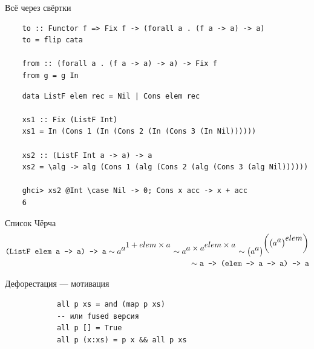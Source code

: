 
    \begin{frame}[fragile]{Всё через свёртки}
        \pause
        \begin{verbatim}
    to :: Functor f => Fix f -> (forall a . (f a -> a) -> a)
    to = flip cata

    from :: (forall a . (f a -> a) -> a) -> Fix f
    from g = g In
        \end{verbatim}
        \pause\vspace{1em}
        \begin{verbatim}
    data ListF elem rec = Nil | Cons elem rec

    xs1 :: Fix (ListF Int)
    xs1 = In (Cons 1 (In (Cons 2 (In (Cons 3 (In Nil))))))

    xs2 :: (ListF Int a -> a) -> a
    xs2 = \alg -> alg (Cons 1 (alg (Cons 2 (alg (Cons 3 (alg Nil))))))

    ghci> xs2 @Int \case Nil -> 0; Cons x acc -> x + acc
    6
        \end{verbatim}
    \end{frame}

    \begin{frame}[fragile]{Список Чёрча}
        \pause
        \begin{align*}
            \text{\texttt{(ListF elem a -> a) -> a}}
            \sim a^{\displaystyle a^{\displaystyle 1 + elem\times a}}
            \sim a^{\displaystyle a\times a^{\displaystyle elem\times a}}
            \sim \left( a^{\displaystyle a} \right)^{\displaystyle \left(\left( a^{\displaystyle a}\right)^{\displaystyle elem}\right)} \\
            \sim \text{\texttt{a -> (elem -> a -> a) -> a}}
        \end{align*}
    \end{frame}

    \begin{frame}[fragile]{Дефорестация --- мотивация}
        \pause
        \begin{verbatim}
            all p xs = and (map p xs)
            -- или fused версия
            all p [] = True
            all p (x:xs) = p x && all p xs
        \end{verbatim}
    \end{frame}


